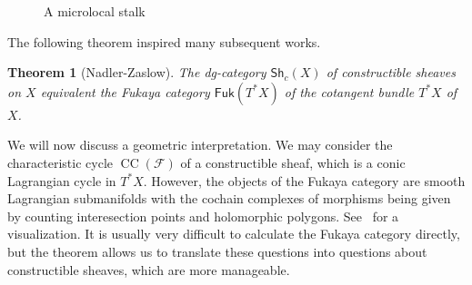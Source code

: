 \documentclass{amsart}
\newtheorem{thm}{Theorem}[section]
\theoremstyle{definition}
\theoremstyle{remark}
\theoremstyle{plain}
\theoremstyle{definition}
\theoremstyle{remark}
\newcommand{\mc}[1]{\mathcal{#1}}
\newcommand{\on}[1]{\operatorname{#1}}
\newcommand{\ms}[1]{\mathsf{#1}}
\newcommand{\1}{\mathbf{1}}
\newcommand{\2}{\mathbf{2}}
\newcommand{\3}{\mathbf{3}}
\begin{document}
\begin{figure}[htpb]
\begin{center}
\end{center}
\caption{A microlocal stalk}%
\label{fig:microlocal_stalk}
\end{figure}


The following theorem inspired many subsequent works.
\begin{thm}[Nadler-Zaslow]
    The dg-category \(\ms{Sh}_c(X)\) of constructible sheaves on \(X\) equivalent the Fukaya category \(\ms{Fuk}(T^* X)\) of the cotangent bundle \(T^* X\) of \(X\).
\end{thm}
We will now discuss a geometric interpretation. We may consider the characteristic cycle \(\on{CC}(\mc{F})\) of a constructible sheaf, which is a conic Lagrangian cycle in \(T^* X\). However, the objects of the Fukaya category are smooth Lagrangian submanifolds with the cochain complexes of morphisms being given by counting interesection points and holomorphic polygons. See~ for a visualization. It is usually very difficult to calculate the Fukaya category directly, but the theorem allows us to translate these questions into questions about constructible sheaves, which are more manageable.
\end{document}
